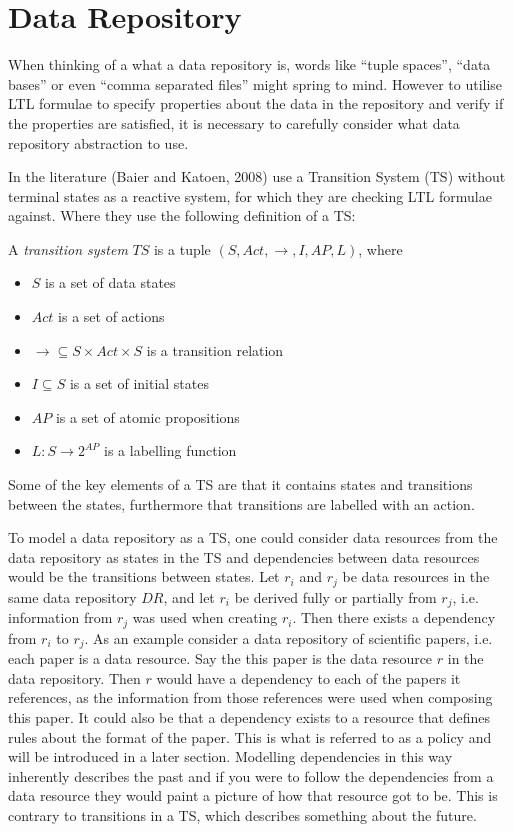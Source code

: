 \section{Data Repository}
When thinking of a what a data repository is, words like ``tuple spaces'', ``data bases'' or even ``comma separated files'' might spring to mind. However to utilise LTL formulae to specify properties about the data in the repository and verify if the properties are satisfied, it is necessary to carefully consider what data repository abstraction to use. 

In the literature (Baier and Katoen, 2008)\cite{baier2008principles} use a Transition System (TS) without terminal states as a reactive system, for which they are checking LTL formulae against. Where they use the following definition of a TS:
\begin{definition}\label{def:ts}
A \emph{transition system} $TS$ is a tuple $\left(S, Act, \longrightarrow, I, AP, L \right)$, where
\begin{itemize}
  \item $S$ is a set of data states
  \item $Act$ is a set of actions
  \item $\longrightarrow \subseteq S \times Act \times S$ is a transition relation
  \item $I \subseteq S$ is a set of initial states
  \item $AP$ is a set of atomic propositions
  \item $L : S \rightarrow 2^{AP}$ is a labelling function
\end{itemize}
\end{definition}
Some of the key elements of a TS are that it contains states and transitions between the states, furthermore that transitions are labelled with an action. 

To model a data repository as a TS, one could consider data resources from the data repository as states in the TS and dependencies between data resources would be the transitions between states. Let $r_i$ and $r_j$ be data resources in the same data repository $DR$, and let $r_i$ be derived fully or partially from $r_j$, i.e. information from $r_j$ was used when creating $r_i$. Then there exists a dependency from $r_i$ to $r_j$. As an example consider a data repository of scientific papers, i.e. each paper is a data resource. Say the this paper is the data resource $r$ in the data repository. Then $r$ would have a dependency to each of the papers it references, as the information from those references were used when composing this paper. It could also be that a dependency exists to a resource that defines rules about the format of the paper. This is what is referred to as a policy and will be introduced in a later section. Modelling dependencies in this way inherently describes the past and if you were to follow the dependencies from a data resource they would paint a picture of how that resource got to be. This is contrary to transitions in a TS, which describes something about the future.

